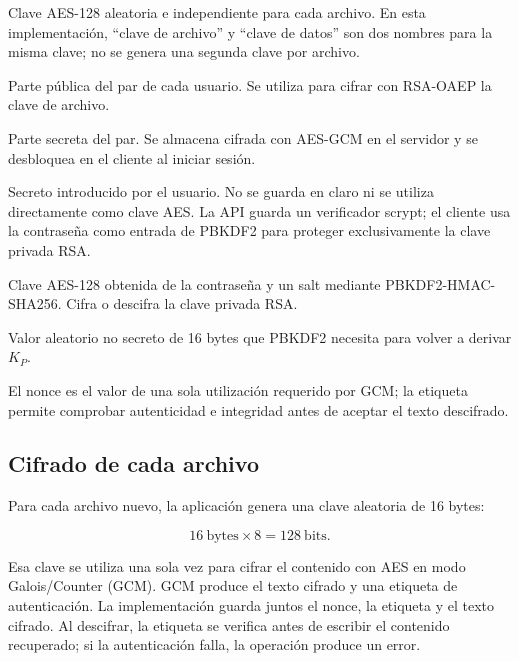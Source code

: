 \documentclass[12pt,a4paper]{article}
\begin{document}
\begin{description}[style=nextline,leftmargin=0pt]
    \item[Clave de archivo o clave de datos ($K_F$)]
    Clave AES-128 aleatoria e independiente para cada archivo. En esta implementación, ``clave de archivo'' y ``clave de datos'' son dos nombres para la misma clave; no se genera una segunda clave por archivo.
    \item[Clave pública RSA ($(n,e)$)]
    Parte pública del par de cada usuario. Se utiliza para cifrar con RSA-OAEP la clave de archivo.
    \item[Clave privada RSA ($(n,d)$)]
    Parte secreta del par. Se almacena cifrada con AES-GCM en el servidor y se desbloquea en el cliente al iniciar sesión.
    \item[Contraseña de inicio de sesión ($P$)]
    Secreto introducido por el usuario. No se guarda en claro ni se utiliza directamente como clave AES. La API guarda un verificador scrypt; el cliente usa la contraseña como entrada de PBKDF2 para proteger exclusivamente la clave privada RSA.
    \item[Clave derivada de protección ($K_P$)]
    Clave AES-128 obtenida de la contraseña y un salt mediante PBKDF2-HMAC-SHA256. Cifra o descifra la clave privada RSA.
    \item[Salt ($s$)]
    Valor aleatorio no secreto de 16 bytes que PBKDF2 necesita para volver a derivar $K_P$.
    \item[Nonce ($N$) y etiqueta ($T$)]
    El nonce es el valor de una sola utilización requerido por GCM; la etiqueta permite comprobar autenticidad e integridad antes de aceptar el texto descifrado.
\end{description}

\subsection{Cifrado de cada archivo}

Para cada archivo nuevo, la aplicación genera una clave aleatoria de 16 bytes:

\[
16\ \text{bytes} \times 8 = 128\ \text{bits}.
\]

Esa clave se utiliza una sola vez para cifrar el contenido con AES en modo Galois/Counter (GCM). GCM produce el texto cifrado y una etiqueta de autenticación. La implementación guarda juntos el nonce, la etiqueta y el texto cifrado. Al descifrar, la etiqueta se verifica antes de escribir el contenido recuperado; si la autenticación falla, la operación produce un error.
\end{document}
